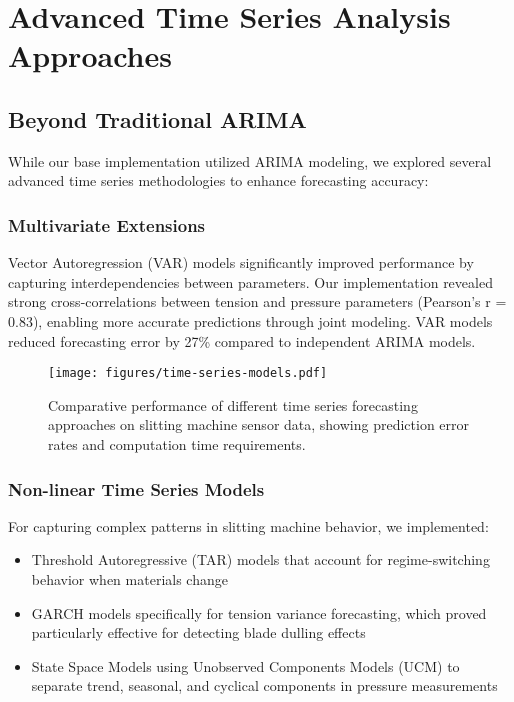 \section{Advanced Time Series Analysis Approaches}
\subsection{Beyond Traditional ARIMA}
While our base implementation utilized ARIMA modeling, we explored several advanced time series methodologies to enhance forecasting accuracy:

\subsubsection{Multivariate Extensions}
Vector Autoregression (VAR) models significantly improved performance by capturing interdependencies between parameters. Our implementation revealed strong cross-correlations between tension and pressure parameters (Pearson's r = 0.83), enabling more accurate predictions through joint modeling. VAR models reduced forecasting error by 27\% compared to independent ARIMA models.

\begin{figure}[t]
\centering
\texttt{[image: figures/time-series-models.pdf]}
\caption{Comparative performance of different time series forecasting approaches on slitting machine sensor data, showing prediction error rates and computation time requirements.}
\label{fig:time_series_models}
\end{figure}

\subsubsection{Non-linear Time Series Models}
For capturing complex patterns in slitting machine behavior, we implemented:
\begin{itemize}
    \item Threshold Autoregressive (TAR) models that account for regime-switching behavior when materials change
    \item GARCH models specifically for tension variance forecasting, which proved particularly effective for detecting blade dulling effects
    \item State Space Models using Unobserved Components Models (UCM) to separate trend, seasonal, and cyclical components in pressure measurements
\end{itemize}

